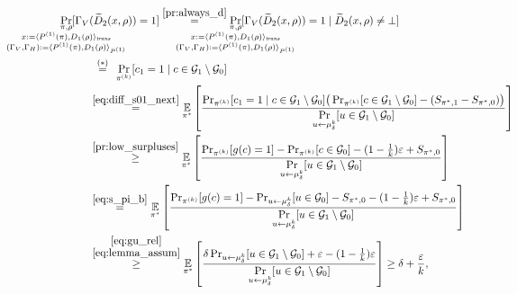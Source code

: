 \begin{align*}
\underset{
  \mathclap{
  \substack{\pi, \rho \\ x := \langle P^{(1)}(\pi), D_1(\rho) \rangle_{\trans}
    \\ (\Gamma_V, \Gamma_H) := \langle P^{(1)}(\pi), D_1 (\rho) \rangle_{P^{(1)}} }}}
{\Pr}[\Gamma_V&(\widetilde{D}_2(x,\rho)) = 1]
  \overset{\eqref{pr:always_d}}{=}
\underset{
  \mathclap{
  \substack{\pi, \rho \\ x := \langle P^{(1)}(\pi), D_1(\rho) \rangle_{\trans}
    \\ (\Gamma_V, \Gamma_H) := \langle P^{(1)}(\pi), D_1 (\rho) \rangle_{P^{(1)}} }}}
{\Pr}[\Gamma_V(\widetilde{D}_2(x,\rho)) = 1 \mid \widetilde{D}_2(x,\rho) \neq \bot] \\
  &\overset{\hphantom{a}(*)\hphantom{a}}{=} \underset{\pi^{(k)}}{\Pr}[c_1 = 1 \mid c \in \cG_1 \setminus \cG_0] \\
  &\overset{\eqref{eq:diff_s01_next}}{=} \underset{\pi^*}{\mathbb{E}}
  \left[\frac{\Pr_{\pi^{(k)}}[c_1 = 1 \mid c \in \cG_1 \setminus \cG_0] \big(\Pr_{\pi^{(k)}}[c \in \cG_1 \setminus \cG_0] - (S_{\pi^*,1} - S_{\pi^*,0})\big)}
  {\underset{u \leftarrow \mu_{\delta}^{k}}{\Pr}[u \in \cG_1 \setminus \cG_0]}\right] \\
  &\overset{\eqref{pr:low_surpluses}}{\geq} \underset{\pi^*}{\mathbb{E}}
  \left[\frac{\Pr_{\pi^{(k)}}[g(c)=1] - \Pr_{\pi^{(k)}}[c \in \cG_0]  - (1 - \frac{1}{k})\epsilon + S_{\pi^*,0}}
  {\underset{u \leftarrow \mu_{\delta}^{k}}{\Pr}[u \in \cG_1 \setminus \cG_0]}\right] \\
  &\overset{\eqref{eq:s_pi_b}}{=} \underset{\pi^*}{\mathbb{E}}
  \left[\frac{\Pr_{\pi^{(k)}}[g(c)=1] - \Pr_{u \leftarrow \mu_{\delta}^{k}}[u \in \cG_0] - S_{\pi^*,0}  - (1 - \frac{1}{k})\epsilon + S_{\pi^*,0}}
  {\underset{u \leftarrow \mu_{\delta}^{k}}{\Pr}[u \in \cG_1 \setminus \cG_0]}\right]\\
  &\overset{\substack{\eqref{eq:gu_rel}\\\eqref{eq:lemma_assum}}}{\geq} \underset{\pi^*}{\mathbb{E}}
  \left[\frac{\delta \Pr_{u \leftarrow \mu_{\delta}^{k}}[u \in \cG_1 \setminus \cG_0] + \epsilon  - (1 - \frac{1}{k})\epsilon}
  {\underset{u \leftarrow \mu_{\delta}^{k}}{\Pr}[u \in \cG_1 \setminus \cG_0]}\right] \geq \delta + \frac{\epsilon}{k},

\end{align*}
